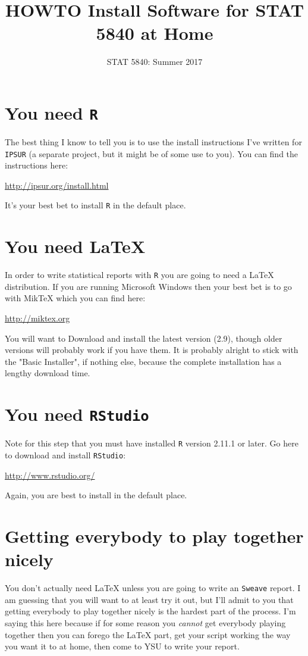 \documentclass[10pt,english]{article}
\date{STAT 5840: Summer 2017}
\title{HOWTO Install Software for STAT 5840 at Home}
\begin{document}
\maketitle
\thispagestyle{empty}


\section*{You need \texttt{R}}
\label{sec:orgheadline1}
The best thing I know to tell you is to use the install instructions
I've written for \texttt{IPSUR} (a separate project, but it might be of some
use to you).  You can find the instructions here:
\begin{center}
\url{http://ipsur.org/install.html}
\end{center}
It's your best bet to install \texttt{R} in the default place.

\section*{You need \LaTeX{}}
\label{sec:orgheadline2}
In order to write statistical reports with \texttt{R} you are going to need a
\LaTeX{} distribution.  If you are running Microsoft Windows then
your best bet is to go with MikTeX which you can find here:
\begin{center}
\url{http://miktex.org}
\end{center}
You will want to Download and install the latest version (2.9), though
older versions will probably work if you have them.  It is probably
alright to stick with the "Basic Installer", if nothing else, because
the complete installation has a lengthy download time.

\section*{You need \texttt{RStudio}}
\label{sec:orgheadline3}
Note for this step that you must have installed \texttt{R} version 2.11.1 or
later.  Go here to download and install \texttt{RStudio}:
\begin{center}
\url{http://www.rstudio.org/}
\end{center}
Again, you are best to install in the default place.


\section*{Getting everybody to play together nicely}
\label{sec:orgheadline4}
You don't actually need \LaTeX{} unless you are going to write an
\texttt{Sweave} report.  I am guessing that you will want to at least try it
out, but I'll admit to you that getting everybody to play together
nicely is the hardest part of the process.  I'm saying this here
because if for some reason you \emph{cannot} get everybody playing together
then you can forego the \LaTeX{} part, get your script working the
way you want it to at home, then come to YSU to write your report.
\end{document}
